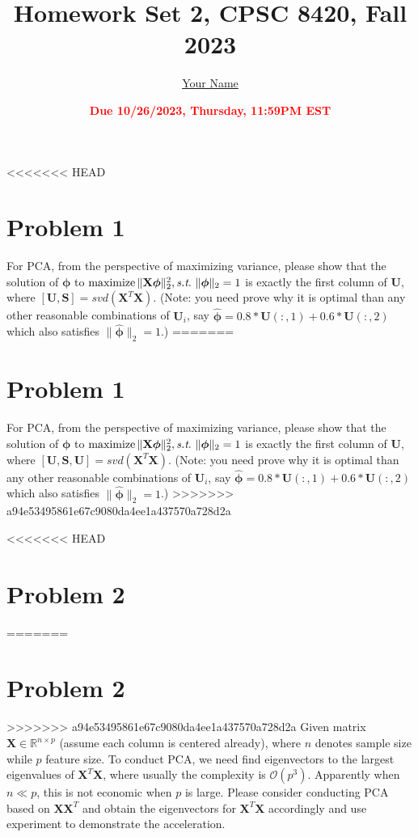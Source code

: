 \documentclass[11pt]{article}
\title{{\bf Homework Set 2, CPSC 8420, Fall 2023}} %
\author{\Large\underline{Your Name}}
\date{\textbf{\Large\textcolor{red}{Due 10/26/2023, Thursday, 11:59PM EST}}} %
\newcommand{\R}{\mathbb{R}}
\newcommand{\maximize}{\operatorname*{maximize}}
\newcommand{\mtx}[1]{\mathbf{#1}}
\def \mU {\mtx{U}}
\def \mS {\mtx{S}}
\def \mX {\mtx{X}}
\def \R {\mathbb{R}}
\begin{document}
	\maketitle
	

<<<<<<< HEAD
	\section{Problem 1}
	For PCA, from the perspective of maximizing variance, please show that the solution of $\bm{\phi}$ to $\maximize \|\mX \bm{\phi}\|^2_2, \st \ \|\bm{\phi}\|_2=1$ is exactly the first column of $\mU$, where $[\mU,\mS]=svd(\mX^T\mX)$. (Note: you need prove why it is optimal than any other reasonable combinations of $\mU_i$, say $\hat{\bm{\phi}}=0.8*\mU(:,1)+0.6*\mU(:,2)$ which also  satisfies $\|\hat{\bm{\phi}}\|_2=1$.)
=======
	\section*{Problem 1}
	For PCA, from the perspective of maximizing variance, please show that the solution of 
	$\bm{\phi}$ to $\maximize \|\mX \bm{\phi}\|^2_2, \st \ \|\bm{\phi}\|_2=1$ is exactly the first column of 
	$\mU$, where $[\mU,\mS, \mU]=svd(\mX^T\mX)$. (Note: you need prove why it is optimal than any other reasonable combinations of $\mU_i$, say $\hat{\bm{\phi}}=0.8*\mU(:,1)+0.6*\mU(:,2)$ which also  satisfies $\|\hat{\bm{\phi}}\|_2=1$.)
>>>>>>> a94e53495861e67c9080da4ee1a437570a728d2a
	


	
	\vspace{4cm}
<<<<<<< HEAD
	\section{Problem 2}
=======
	\section*{Problem 2}
>>>>>>> a94e53495861e67c9080da4ee1a437570a728d2a
	Given matrix $\mX\in\R^{n\times p}$ (assume each column is centered already), where $n$ denotes sample size while $p$ feature size. To conduct PCA, we need find eigenvectors to the  largest eigenvalues of $\mX^T\mX$, where usually the complexity is $\mathcal{O}(p^3)$. Apparently when $n\ll p$, this is not economic when $p$ is large. Please consider conducting PCA based on $\mX\mX^T$ and obtain the eigenvectors for $\mX^T\mX$ accordingly and use experiment to demonstrate the acceleration.
		\vspace{5cm}
	
\end{document}
